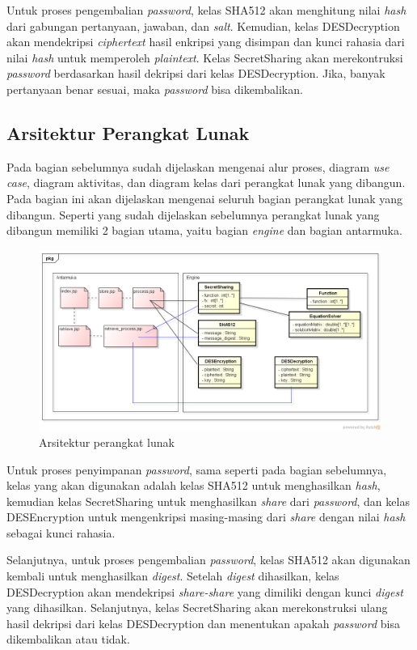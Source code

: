 Untuk proses pengembalian \textit{password}, kelas SHA512 akan menghitung nilai \textit{hash} dari gabungan pertanyaan, jawaban, dan \textit{salt}. Kemudian, kelas DESDecryption akan mendekripsi \textit{ciphertext} hasil enkripsi yang disimpan dan kunci rahasia dari nilai \textit{hash} untuk memperoleh \textit{plaintext}. Kelas SecretSharing akan merekontruksi \textit{password} berdasarkan hasil dekripsi dari kelas DESDecryption. Jika, banyak pertanyaan benar sesuai, maka \textit{password} bisa dikembalikan.

\subsection{Arsitektur Perangkat Lunak}

Pada bagian sebelumnya sudah dijelaskan mengenai alur proses, diagram \textit{use case}, diagram aktivitas, dan diagram kelas dari perangkat lunak yang dibangun. Pada bagian ini akan dijelaskan mengenai seluruh bagian perangkat lunak yang dibangun. Seperti yang sudah dijelaskan sebelumnya perangkat lunak yang dibangun memiliki 2 bagian utama, yaitu bagian \textit{engine} dan bagian antarmuka.

\begin{figure}[H]
	\centerline{\includegraphics[scale=0.5]{Gambar/arsitektur}}
	\label{fig:arsitektur-perangkat-lunak}
	\caption{Arsitektur perangkat lunak}
\end{figure}

Untuk proses penyimpanan \textit{password}, sama seperti pada bagian sebelumnya, kelas yang akan digunakan adalah kelas SHA512 untuk menghasilkan \textit{hash}, kemudian kelas SecretSharing untuk menghasilkan \textit{share} dari \textit{password}, dan kelas DESEncryption untuk mengenkripsi masing-masing dari \textit{share} dengan nilai \textit{hash} sebagai kunci rahasia.

Selanjutnya, untuk proses pengembalian \textit{password}, kelas SHA512 akan digunakan kembali untuk menghasilkan \textit{digest}. Setelah \textit{digest} dihasilkan, kelas DESDecryption akan mendekripsi \textit{share-share} yang dimiliki dengan kunci \textit{digest} yang dihasilkan. Selanjutnya, kelas SecretSharing akan merekonstruksi ulang hasil dekripsi dari kelas DESDecryption dan menentukan apakah \textit{password} bisa dikembalikan atau tidak.